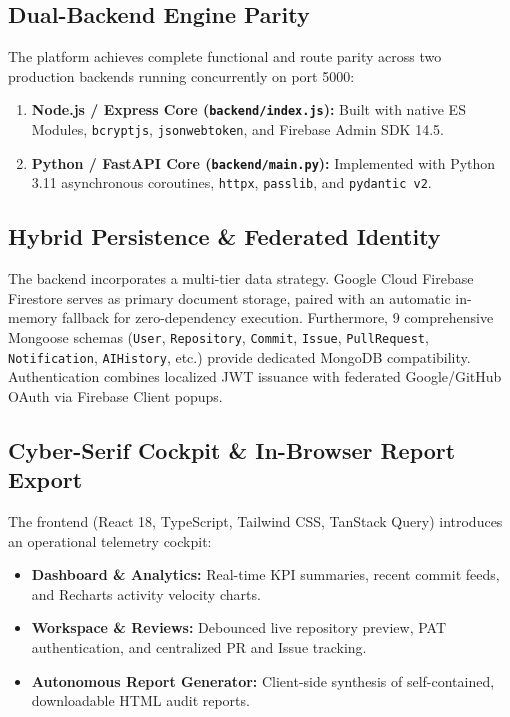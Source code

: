 \documentclass[conference]{IEEEtran}
\begin{document}
\subsection{Dual-Backend Engine Parity}
The platform achieves complete functional and route parity across two production backends running concurrently on port 5000:
\begin{enumerate}
    \item \textbf{Node.js / Express Core (\texttt{backend/index.js}):} Built with native ES Modules, \texttt{bcryptjs}, \texttt{jsonwebtoken}, and Firebase Admin SDK 14.5.
    \item \textbf{Python / FastAPI Core (\texttt{backend/main.py}):} Implemented with Python 3.11 asynchronous coroutines, \texttt{httpx}, \texttt{passlib}, and \texttt{pydantic v2}.
\end{enumerate}

\subsection{Hybrid Persistence \& Federated Identity}
The backend incorporates a multi-tier data strategy. Google Cloud Firebase Firestore serves as primary document storage, paired with an automatic in-memory fallback for zero-dependency execution. Furthermore, 9 comprehensive Mongoose schemas (\texttt{User}, \texttt{Repository}, \texttt{Commit}, \texttt{Issue}, \texttt{PullRequest}, \texttt{Notification}, \texttt{AIHistory}, etc.) provide dedicated MongoDB compatibility. Authentication combines localized JWT issuance with federated Google/GitHub OAuth via Firebase Client popups.

\subsection{Cyber-Serif Cockpit \& In-Browser Report Export}
The frontend (React 18, TypeScript, Tailwind CSS, TanStack Query) introduces an operational telemetry cockpit:
\begin{itemize}
    \item \textbf{Dashboard \& Analytics:} Real-time KPI summaries, recent commit feeds, and Recharts activity velocity charts.
    \item \textbf{Workspace \& Reviews:} Debounced live repository preview, PAT authentication, and centralized PR and Issue tracking.
    \item \textbf{Autonomous Report Generator:} Client-side synthesis of self-contained, downloadable HTML audit reports.
\end{itemize}
\end{document}
